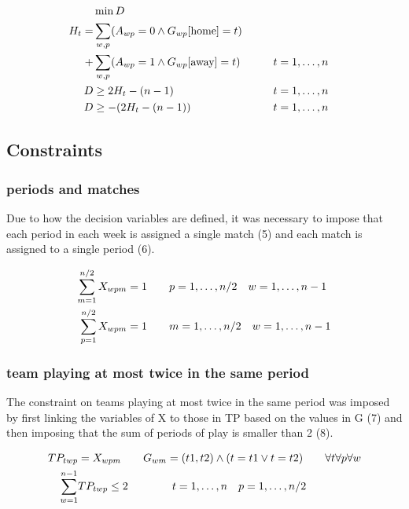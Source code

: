 \begin{align}
    &\min  D \\
    H_t =& \sum_{w, p} (A_{wp} = 0 \land G_{wp}[\text{home}] = t) \notag \\
    +& \sum_{w, p} (A_{wp} = 1 \land G_{wp}[\text{away}] = t) \hspace{20px}  &&t =1, \dots, n\\
    D &\geq 2H_t - (n-1) && t = 1, \dots, n\\
    D & \geq -(2 H_t - (n-1)) && t = 1, \dots, n
\end{align}


\subsection{Constraints}
\subsubsection{periods and matches}
Due to how the decision variables are defined, it was necessary to impose that each period in each week is assigned a single match (5) and each match is assigned to a single period (6).

\begin{align}
    \sum_{m = 1}^{n/2} X_{wpm} &= 1 \hspace{20px} p =1, \dots, n/2 \hspace{10px} w = 1,\dots, n-1 \\
    \sum_{p = 1}^{n/2} X_{wpm} &= 1 \hspace{20px} m = 1, \dots, n/2 \hspace{10px} w = 1,\dots, n-1
\end{align}

\subsubsection{team playing at most twice in the same period}
The constraint on teams playing at most twice in the same period was imposed by first linking the variables of X to those in TP based on the values in G (7) and then imposing that the sum of periods of play is smaller than 2 (8). 

\begin{align}
    TP_{twp} &= X_{wpm} \hspace{20px} G_{wm} =(t1, t2) \land (t = t1 \lor t=t2) \hspace{20px} \forall t \forall p  \forall w\\
    \sum_{w=1}^{n-1} &TP_{twp} \leq 2 \hspace{40px} t=1, \dots, n \hspace{10px} p = 1, \dots, n/2
\end{align}

